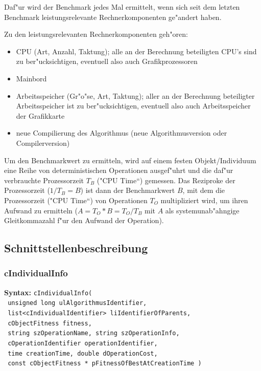 Daf"ur wird der Benchmark jedes Mal ermittelt, wenn sich seit dem letzten Benchmark leistungsrelevante Rechnerkomponenten ge"andert haben.

\bigskip\noindent
Zu den leistungsrelevanten Rechnerkomponenten geh"oren:
\begin{itemize}
 \item CPU (Art, Anzahl, Taktung); alle an der Berechnung beteiligten CPU's sind zu ber"ucksichtigen, eventuell also auch Grafikprozessoren
 \item Mainbord
 \item Arbeitsspeicher (Gr"o"se, Art, Taktung); aller an der Berechnung beteiligter Arbeitsspeicher ist zu ber"ucksichtigen, eventuell also auch Arbeitsspeicher der Grafikkarte
 \item neue Compilierung des Algorithmus (neue Algorithmusversion oder Compilerversion)
\end{itemize}

Um den Benchmarkwert zu ermitteln, wird auf einem festen Objekt/Individuum eine Reihe von deterministischen Operationen ausgef"uhrt und die daf"ur verbrauchte Prozessorzeit $T_B$ ("CPU Time``) gemessen. Das Reziproke der Prozessorzeit ($1/T_B=B$) ist dann der Benchmarkwert $B$, mit dem die Prozessorzeit ("CPU Time``) von Operationen $T_{O}$ multipliziert wird, um ihren Aufwand zu ermitteln ($A=T_O*B=T_O/T_B$ mit $A$ als systemunab"ahngige Gleitkommazahl f"ur den Aufwand der Operation).


\subsection{Schnittstellenbeschreibung}

\subsubsection{cIndividualInfo}

\textbf{Syntax:} \verb|cIndividualInfo(| \\\verb| unsigned long ulAlgorithmusIdentifier,| \\\verb| list<cIndividualIdentifier> liIdentifierOfParents,| \\\verb| cObjectFitness fitness,| \\\verb| string szOperationName, string szOperationInfo,| \\\verb| cOperationIdentifier operationIdentifier,| \\\verb| time creationTime, double dOperationCost,| \\\verb| const cObjectFitness * pFitnessOfBestAtCreationTime )| \\

